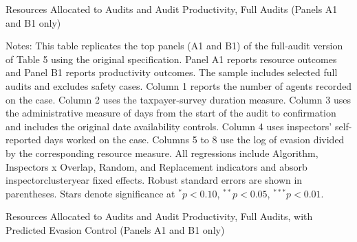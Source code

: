 \documentclass{article}
\newcommand{\OutPath}{Output/}%
\newcommand{\OutPath}{../Output/}%
\begin{document}
\begin{landscape}
\begin{table}[H]\centering
\begin{adjustbox}{max width=1.4\textwidth}
\begin{threeparttable}
\caption{Resources Allocated to Audits and Audit Productivity, Full Audits (Panels A1 and B1 only)}
\label{tab:table5_fullaudits_replicated}

\footnotesize


\begin{tablenotes}[flushleft]
\footnotesize
\item Notes: This table replicates the top panels (A1 and B1) of the full-audit version of Table 5 using the original specification. Panel A1 reports resource outcomes and Panel B1 reports productivity outcomes. The sample includes selected full audits and excludes safety cases. Column 1 reports the number of agents recorded on the case. Column 2 uses the taxpayer-survey duration measure. Column 3 uses the administrative measure of days from the start of the audit to confirmation and includes the original date availability controls. Column 4 uses inspectors' self-reported days worked on the case. Columns 5 to 8 use the log of evasion divided by the corresponding resource measure. All regressions include Algorithm, Inspectors x Overlap, Random, and Replacement indicators and absorb inspectorclusteryear fixed effects. Robust standard errors are shown in parentheses. Stars denote significance at $^{*}p<0.10$, $^{**}p<0.05$, $^{***}p<0.01$.
\end{tablenotes}
\end{threeparttable}
\end{adjustbox}
\end{table}

\begin{table}[H]\centering
\begin{adjustbox}{max width=1.4\textwidth}
\begin{threeparttable}
\caption{Resources Allocated to Audits and Audit Productivity, Full Audits, with Predicted Evasion Control (Panels A1 and B1 only)}
\label{tab:table5_fullaudits_yhatrf_control}

\footnotesize



\end{threeparttable}
\end{adjustbox}
\end{table}
\end{landscape}
\end{document}
